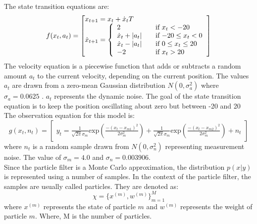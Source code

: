 \documentclass[12pt]{article}
\begin{document}
The state transition equations are:
\begin{equation}
f(x_t,a_t) = \begin{bmatrix*}[l]
x_{t+1} = x_t + \dot{x}_t T \\
\dot{x}_{t+1} = \left\{
\begin{array}{l l}
  2 & \quad \text{if $x_t < -20$} \\
  \dot{x}_t + |a_t| & \quad \text{if $-20 \le x_t < 0$} \\
  \dot{x}_t - |a_t| & \quad \text{if $0 \le x_t \le 20$} \\
  -2 & \quad \text{if $x_t > 20$} \\
\end{array} \right.
\end{bmatrix*}
\label{eq:ST}
\end{equation}
The velocity equation is a piecewise function that adds or subtracts a random amount $a_t$ to the current velocity, depending on the current position. The values $a_t$ are drawn from a zero-mean Gaussian distribution $N(0,\sigma_a^2)$ where $\sigma_a = 0.0625$ . $a_t$ represents the dynamic noise. The goal of the state transition equation is to keep the position oscillating about zero but between -20 and 20\\

The observation equation for this model is:
\begin{equation}
g(x_t,n_t) = \begin{bmatrix}
y_t = \frac{1}{\sqrt{2 \pi} \sigma_m}
\mathrm{exp} ( \frac{-(x_t - x_{m1})^2}{2 \sigma_m^2} ) +
\frac{1}{\sqrt{2 \pi} \sigma_m}
\mathrm{exp} ( \frac{-(x_t - x_{m2})^2}{2 \sigma_m^2} ) + n_t
\end{bmatrix}
\label{eq:obs}
\end{equation}
where $n_t$ is a random sample drawn from $N(0,\sigma_n^2)$ representing measurement noise. The value of $\sigma_m = 4.0$ and $\sigma_n = 0.003906$.\\

Since the particle filter is a Monte Carlo approximation, the distribution
$p(x|y)$ is represented using a number of samples.  In the context of
the particle filter, the samples are usually called particles.
They are denoted as:
\begin{equation}
\chi = \lbrace x^{(m)}, w^{(m)} \rbrace ^M_{m=1}
\end{equation} 
where $x^{(m)}$ represents the state of particle $m$ and
$w^{(m)}$ represents the weight of particle $m$.
Where, M is the number of particles. \\
\end{document}
